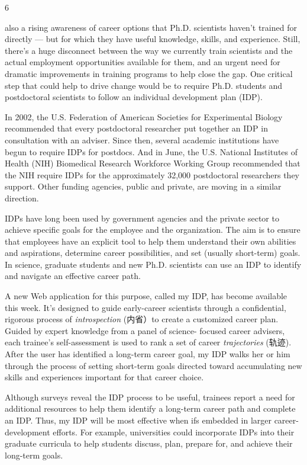 \documentclass[UTF8,11pt]{ctexart}
\begin{document}
6


also a rising awareness of career options that Ph.D. scientists haven’t trained for directly — but for which they have useful knowledge, skills, and experience. Still, there’s a huge disconnect between the way we currently train scientists and the actual employment opportunities available for them, and an urgent need for dramatic improvements in training programs to help close the gap. One critical step that could help to drive change would be to require Ph.D. students and postdoctoral scientists to follow an individual development plan (IDP).


In 2002, the U.S. Federation of American Societies for Experimental Biology recommended that every postdoctoral researcher put together an IDP in consultation with an adviser. Since then, several academic institutions have begun to require IDPs for postdocs. And in June, the U.S. National Institutes of Health (NIH) Biomedical Research Workforce Working Group recommended that the NIH require IDPs for the approximately 32,000 postdoctoral researchers they support. Other funding agencies, public and private, are moving in a similar direction.


IDPs have long been used by government agencies and the private sector to achieve specific goals for the employee and the organization. The aim is to ensure that employees have an explicit tool to help them understand their own abilities and aspirations, determine career possibilities, and set (usually short-term) goals. In science, graduate students and new Ph.D. scientists can use an IDP to identify and navigate an effective career path.


A new Web application for this purpose, called my IDP, has become available this week. It’s designed to guide early-career scientists through a confidential, rigorous process of\textit{ introspection} (内省）to create a customized career plan. Guided by expert knowledge from a panel of science- focused career advisers, each trainee’s self-assessment is used to rank a set of career\textit{ trajectories} (轨迹). After the user has identified a long-term career goal, my IDP walks her or him through the process of setting short-term goals directed toward accumulating new skills and experiences important for that career choice.


Although surveys reveal the IDP process to be useful, trainees report a need for additional resources to help them identify a long-term career path and complete an IDP. Thus, my IDP will be most effective when ifs embedded in larger career-development efforts. For example, universities could incorporate IDPs into their graduate curricula to help students discuss, plan, prepare for, and achieve their long-term goals.
\end{document}
